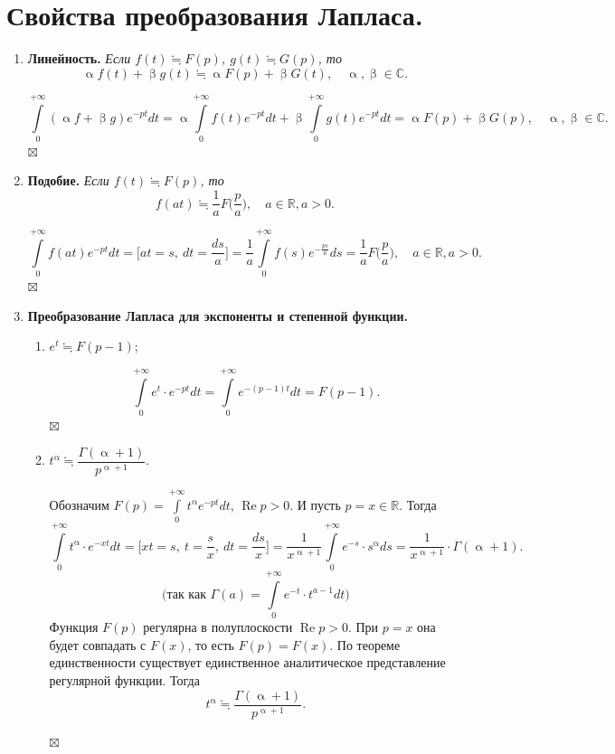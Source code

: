 \documentclass[a4paper, 12pt]{article}
\newenvironment{Proof} %
{\par\noindent{$\blacklozenge$}} %
{\hfill$\scriptstyle\boxtimes$}
\newcommand{\Rm}{\mathbb{R}}
\newcommand{\Cm}{\mathbb{C}}
\renewcommand{\alpha}{\upalpha}
\renewcommand{\beta}{\upbeta}
\renewcommand{\Re}{\operatorname{Re}}
\begin{document}
\section{Свойства преобразования Лапласа.}
\begin{enumerate}
	\item \textbf{Линейность.} \textit{Если $f(t) \fallingdotseq F(p)$, $g(t)\fallingdotseq G(p)$, то} $$\alpha f(t) + \beta g(t) \fallingdotseq \alpha F(p) + \beta G(t),\quad \alpha, \beta \in \Cm.$$
	\begin{Proof}
		$$\int\limits_0^{+\infty}(\alpha f + \beta g) e^{-pt} dt = \alpha \int\limits_0^{+\infty}f(t)e^{-pt}dt + \beta \int\limits_0^{+\infty}g(t)e^{-pt}dt = \alpha F(p) + \beta G(p),\quad \alpha, \beta \in \Cm.$$
	\end{Proof}
	\item \textbf{Подобие.} \textit{Если $f(t)\fallingdotseq F(p)$, то $$f(at) \fallingdotseq \dfrac{1}{a}F\Big(\dfrac{p}{a}\Big),\quad a \in \Rm, a > 0.$$}
	\begin{Proof}
		$$\int\limits_0^{+\infty}f(at)e^{-pt}dt = \Big[at = s,\ dt = \dfrac{ds}{a}\Big] = \dfrac{1}{a} \int\limits_0^{+\infty} f(s)e^{-\frac{ps}{a}}ds = \dfrac{1}{a}F\Big(\dfrac{p}{a}\Big),\quad a \in \Rm, a > 0.$$
	\end{Proof}
	\item \textbf{Преобразование Лапласа для экспоненты и степенной функции.} \begin{enumerate}
		\item $e^t \fallingdotseq F(p-1)$;
		\begin{Proof}
			$$\int\limits_0^{+\infty}e^t \cdot e^{-pt}dt = \int\limits_0^{+\infty} e^{-(p-1)t} dt = F(p-1).$$
		\end{Proof}
		\item $t^\alpha \fallingdotseq \dfrac{\Gamma(\alpha + 1)}{p^{\alpha + 1}}.$
		\begin{Proof}
			Обозначим $F(p) = \int\limits_0^{+\infty}t^\alpha e^{-pt} dt$, $\Re p > 0$. И пусть $p = x \in \mathbb{R}$. Тогда $$\int\limits_0^{+\infty} t^\alpha \cdot  e^{-xt}dt = \Big[xt = s,\ t = \dfrac{s}{x},\ dt = \dfrac{ds}{x}\Big] = \dfrac{1}{x^{\alpha + 1}}\int\limits_0^{+\infty} e^{-s}\cdot s^{\alpha} ds = \dfrac{1}{x^{\alpha + 1}}\cdot \Gamma(\alpha + 1).$$ $$\Big(\text{так как }\Gamma(a) = \int\limits_0^{+\infty} e^{-t}\cdot t^{a-1}dt\Big)$$
			Функция $F(p)$ регулярна в полуплоскости $\Re p > 0$. При $ p = x$ она будет совпадать с $F(x)$, то есть $F( p ) = F(x)$. По теореме единственности существует единственное аналитическое представление регулярной функции. Тогда $$t^\alpha \fallingdotseq \dfrac{\Gamma(\alpha + 1)}{p^{\alpha + 1}}.$$ 

\end{Proof}
\end{enumerate}
\end{enumerate}
\end{document}
